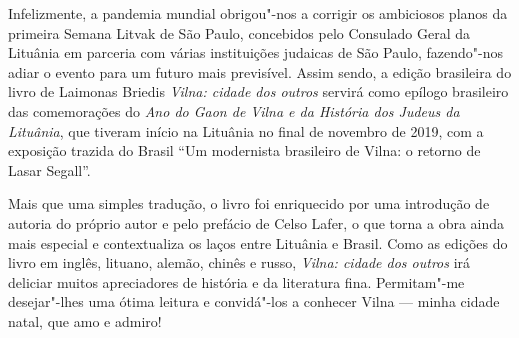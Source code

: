 Infelizmente, a pandemia mundial obrigou"-nos a corrigir os ambiciosos
planos da primeira Semana Litvak de São Paulo, concebidos pelo Consulado
Geral da Lituânia em parceria com várias instituições judaicas de São
Paulo, fazendo"-nos adiar o evento para um futuro mais previsível. Assim
sendo, a edição brasileira do livro de Laimonas Briedis \emph{Vilna: cidade
dos outros} servirá como epílogo brasileiro das comemorações do
\emph{Ano do Gaon de Vilna e da História dos Judeus da Lituânia}, que
tiveram início na Lituânia no final de novembro de 2019, com a exposição
trazida do Brasil ``Um modernista brasileiro de Vilna: o retorno de
Lasar Segall''.

Mais que uma simples tradução, o livro foi enriquecido por uma
introdução de autoria do próprio autor e pelo prefácio de Celso Lafer, o
que torna a obra ainda mais especial e contextualiza os laços entre
Lituânia e Brasil. Como as edições do livro em inglês, lituano, alemão,
chinês e russo, \emph{Vilna: cidade dos outros} irá deliciar muitos
apreciadores de história e da literatura fina. Permitam"-me desejar"-lhes
uma ótima leitura e convidá"-los a conhecer Vilna --- minha cidade natal,
que amo e admiro!

